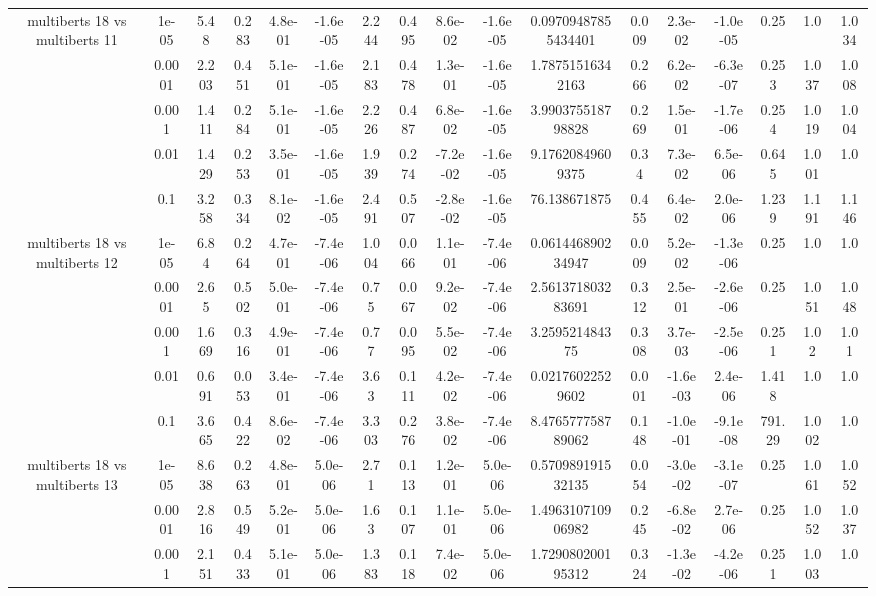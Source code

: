 \begin{tabular}{|c|c|c|c|c|c|c|c|c|c|c|c|c|c|c|c|c|}
\hline
\multirow{5}{*}{multiberts 18 vs multiberts 11} & 1e-05 & 5.48 & 0.283 & 4.8e-01 & -1.6e-05 & 2.244 & 0.495 & 8.6e-02 & -1.6e-05 & 0.09709487855434401 & 0.009 & 2.3e-02 & -1.0e-05 & 0.25 & 1.0 & 1.034 \\
 & 0.0001 & 2.203 & 0.451 & 5.1e-01 & -1.6e-05 & 2.183 & 0.478 & 1.3e-01 & -1.6e-05 & 1.78751516342163 & 0.266 & 6.2e-02 & -6.3e-07 & 0.253 & 1.037 & 1.008 \\
 & 0.001 & 1.411 & 0.284 & 5.1e-01 & -1.6e-05 & 2.226 & 0.487 & 6.8e-02 & -1.6e-05 & 3.990375518798828 & 0.269 & 1.5e-01 & -1.7e-06 & 0.254 & 1.019 & 1.004 \\
 & 0.01 & 1.429 & 0.253 & 3.5e-01 & -1.6e-05 & 1.939 & 0.274 & -7.2e-02 & -1.6e-05 & 9.17620849609375 & 0.34 & 7.3e-02 & 6.5e-06 & 0.645 & 1.001 & 1.0 \\
 & 0.1 & 3.258 & 0.334 & 8.1e-02 & -1.6e-05 & 2.491 & 0.507 & -2.8e-02 & -1.6e-05 & 76.138671875 & 0.455 & 6.4e-02 & 2.0e-06 & 1.239 & 1.191 & 1.146 \\
\hline
\multirow{5}{*}{multiberts 18 vs multiberts 12} & 1e-05 & 6.84 & 0.264 & 4.7e-01 & -7.4e-06 & 1.004 & 0.066 & 1.1e-01 & -7.4e-06 & 0.061446890234947 & 0.009 & 5.2e-02 & -1.3e-06 & 0.25 & 1.0 & 1.0 \\
 & 0.0001 & 2.65 & 0.502 & 5.0e-01 & -7.4e-06 & 0.75 & 0.067 & 9.2e-02 & -7.4e-06 & 2.561371803283691 & 0.312 & 2.5e-01 & -2.6e-06 & 0.25 & 1.051 & 1.048 \\
 & 0.001 & 1.669 & 0.316 & 4.9e-01 & -7.4e-06 & 0.77 & 0.095 & 5.5e-02 & -7.4e-06 & 3.259521484375 & 0.308 & 3.7e-03 & -2.5e-06 & 0.251 & 1.02 & 1.01 \\
 & 0.01 & 0.691 & 0.053 & 3.4e-01 & -7.4e-06 & 3.63 & 0.111 & 4.2e-02 & -7.4e-06 & 0.02176022529602 & 0.001 & -1.6e-03 & 2.4e-06 & 1.418 & 1.0 & 1.0 \\
 & 0.1 & 3.665 & 0.422 & 8.6e-02 & -7.4e-06 & 3.303 & 0.276 & 3.8e-02 & -7.4e-06 & 8.476577758789062 & 0.148 & -1.0e-01 & -9.1e-08 & 791.29 & 1.002 & 1.0 \\
\hline
\multirow{5}{*}{multiberts 18 vs multiberts 13} & 1e-05 & 8.638 & 0.263 & 4.8e-01 & 5.0e-06 & 2.71 & 0.113 & 1.2e-01 & 5.0e-06 & 0.570989191532135 & 0.054 & -3.0e-02 & -3.1e-07 & 0.25 & 1.061 & 1.052 \\
 & 0.0001 & 2.816 & 0.549 & 5.2e-01 & 5.0e-06 & 1.63 & 0.107 & 1.1e-01 & 5.0e-06 & 1.496310710906982 & 0.245 & -6.8e-02 & 2.7e-06 & 0.25 & 1.052 & 1.037 \\
 & 0.001 & 2.151 & 0.433 & 5.1e-01 & 5.0e-06 & 1.383 & 0.118 & 7.4e-02 & 5.0e-06 & 1.729080200195312 & 0.324 & -1.3e-02 & -4.2e-06 & 0.251 & 1.003 & 1.0 \\

\end{tabular}
